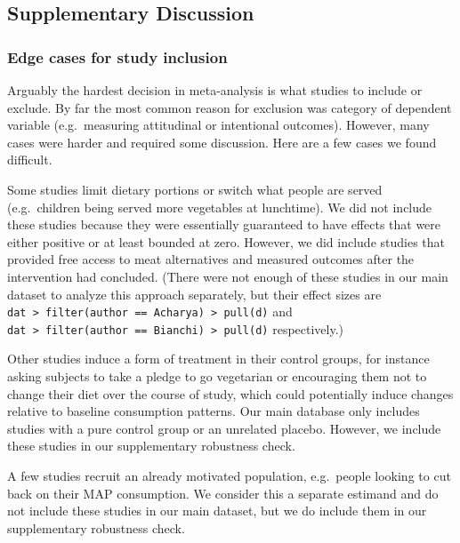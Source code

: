 \documentclass[sn-nature,pdflatex]{sn-jnl}
\begin{document}
\subsection{Supplementary Discussion}\label{supplementary-discussion}

\subsubsection{Edge cases for study
inclusion}\label{edge-cases-for-study-inclusion}

Arguably the hardest decision in meta-analysis is what studies to
include or exclude. By far the most common reason for exclusion was
category of dependent variable (e.g.~measuring attitudinal or
intentional outcomes). However, many cases were harder and required some
discussion. Here are a few cases we found difficult.

Some studies limit dietary portions or switch what people are served
(e.g.~children being served more vegetables at lunchtime). We did not
include these studies because they were essentially guaranteed to have
effects that were either positive or at least bounded at zero. However,
we did include studies that provided free access to meat alternatives
\citep{acharya2004, bianchi2022} and measured outcomes after the
intervention had concluded. (There were not enough of these studies in
our main dataset to analyze this approach separately, but their effect
sizes are
\texttt{dat\ \textbar{}\textgreater{}\ filter(author\ ==\ \textquotesingle{}Acharya\textquotesingle{})\ \textbar{}\textgreater{}\ pull(d)}
and
\texttt{dat\ \textbar{}\textgreater{}\ filter(author\ ==\ \textquotesingle{}Bianchi\textquotesingle{})\ \textbar{}\textgreater{}\ pull(d)}
respectively.)

Other studies induce a form of treatment in their control groups, for
instance asking subjects to take a pledge to go vegetarian or
encouraging them not to change their diet over the course of study,
which could potentially induce changes relative to baseline consumption
patterns. Our main database only includes studies with a pure control
group or an unrelated placebo. However, we include these studies in our
supplementary robustness check.

A few studies recruit an already motivated population, e.g.~people
looking to cut back on their MAP consumption. We consider this a
separate estimand and do not include these studies in our main dataset,
but we do include them in our supplementary robustness check.
\end{document}
